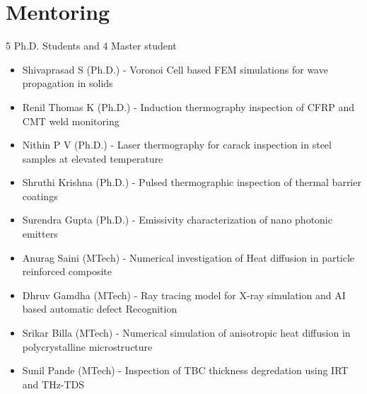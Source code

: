 \documentclass{my_cv}%
\begin{document}
\section{Mentoring}
\vspace{1em}
\noindent \faEye \hspace{1em} \color{mygray} 5 Ph.D. Students and 4 Master student 
\begin{itemize}[leftmargin=0.15in]
\setlength\itemsep{-0.1em}
\color{mygray}
\item Shivaprasad S (Ph.D.) - Voronoi Cell based FEM simulations for wave propagation in solids \cite{Shivaprasadcomsolconf2015,Shivaprasadconf2015}
\item Renil Thomas K (Ph.D.) - Induction thermography inspection of CFRP and CMT weld monitoring \cite{Renilconf2016,Kidanganconf2016,thomas2017} 
\item Nithin P V (Ph.D.) - Laser thermography for carack inspection in steel samples at elevated temperature \cite{Nithin2019,Nithinconf2016,Nithinconf2018,puthiyaveettil2020}
\item Shruthi Krishna (Ph.D.) - Pulsed thermographic inspection of thermal barrier coatings \cite{Sruthiconf2018,Krishnaconf2017}
\item Surendra Gupta (Ph.D.) - Emissivity characterization of nano photonic emitters \cite{Surendraconf2020,Surendra2021}
\item Anurag Saini (MTech) - Numerical investigation of Heat diffusion in particle reinforced composite \cite{Saini2020}
\item Dhruv Gamdha (MTech) - Ray tracing model for X-ray simulation and AI based automatic defect Recognition \cite{Dhruv2019,Dhruv2021}
\item Srikar Billa (MTech) - Numerical simulation of anisotropic heat diffusion in polycrystalline microstructure
\item Sunil Pande (MTech) - Inspection of TBC thickness degredation using IRT and THz-TDS
\end{itemize}
\end{document}
